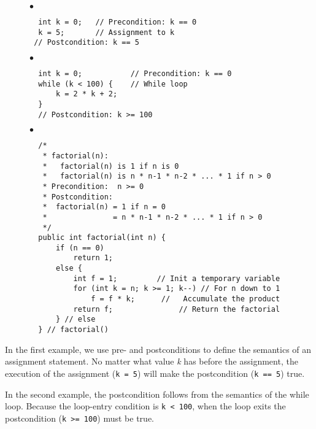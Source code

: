 \begin{figure}[htb]
\jjjprogstart
\mbox{$\bullet$} \vspace{-18pt}
\begin{jjjlisting}
\begin{lstlisting}
  int k = 0;   // Precondition: k == 0
  k = 5;       // Assignment to k
 // Postcondition: k == 5
\end{lstlisting}
\end{jjjlisting}


\mbox{$\bullet$} \vspace{-18pt}
\begin{jjjlisting}
\begin{lstlisting}
  int k = 0;           // Precondition: k == 0
  while (k < 100) {    // While loop
      k = 2 * k + 2;
  }
  // Postcondition: k >= 100
\end{lstlisting}
\end{jjjlisting}


\mbox{$\bullet$} \vspace{-18pt}
\begin{jjjlisting}
\begin{lstlisting}
  /*
   * factorial(n):
   *   factorial(n) is 1 if n is 0
   *   factorial(n) is n * n-1 * n-2 * ... * 1 if n > 0
   * Precondition:  n >= 0
   * Postcondition: 
   *  factorial(n) = 1 if n = 0
   *               = n * n-1 * n-2 * ... * 1 if n > 0
   */
  public int factorial(int n) {
      if (n == 0)
          return 1;
      else {
          int f = 1;         // Init a temporary variable
          for (int k = n; k >= 1; k--) // For n down to 1
              f = f * k;      //   Accumulate the product
          return f;               // Return the factorial
      } // else
  } // factorial()
\end{lstlisting}
\end{jjjlisting}
\end{figure}

In the first example, we use pre- and postconditions to define
the semantics of an assignment statement. No matter what value {\it k} has
before the assignment, the execution of the assignment ({\tt k = 5}) will make
the postcondition ({\tt k == 5}) true.

In the second example, the postcondition follows from the semantics of
the while loop. Because the loop-entry condition is \verb|k < 100|,
when the loop exits the postcondition (\verb|k >= 100|) must be true.

